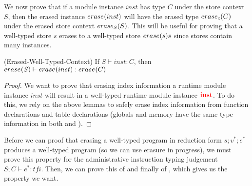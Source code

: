 We now prove that if a \name module instance $inst$ has type $C$ under the store context $S$, then the erased \wasm instance $\erase{inst}$ will have the erased type $\erase[c]{C}$ under the erased store context $\erase[S]{S}$.
This will be useful for proving that a well-typed \name store $s$ erases to a well-typed \wasm store $\erase{s}{s}$ since stores contain many instances.

\begin{lemma}{(Erased-Well-Typed-Context)}
    If $S \vdash inst : C$, then $\erase{S} \vdash \erase{inst} : \erase{C}$
\end{lemma}
\begin{proof}
    We want to prove that erasing index information a \name runtime module instance $inst$ will result in a well-typed \wasm runtime module instance $\mathredbold{inst}$.
    To do this, we rely on the above lemmas to safely erase index information from function declarations and table declarations (globals and memory have the same type information in both \name and \wasm).

\end{proof}


Before we can proof that erasing a well-typed \name program in reduction form $s;v^{*};e^{*}$ produces a well-typed \wasm program (so we can use erasure in progress), we must prove this property for the \name administrative instruction typing judgement $S;C\vdash e^{*}:tfi$.
Then, we can prove this of  and finally of , which gives us the property we want.

